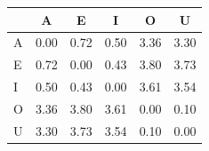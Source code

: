 \begin{tabular}{lccccc}
\toprule
\rowcolor{col01}
 & A & E & I & O & U \\
\midrule
A & 0.00 & 0.72 & 0.50 & 3.36 & 3.30 \\
E & 0.72 & 0.00 & 0.43 & 3.80 & 3.73 \\
I & 0.50 & 0.43 & 0.00 & 3.61 & 3.54 \\
O & 3.36 & 3.80 & 3.61 & 0.00 & 0.10 \\
U & 3.30 & 3.73 & 3.54 & 0.10 & 0.00 \\
\bottomrule
\end{tabular}
